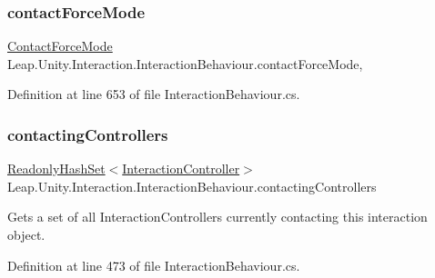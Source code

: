 \subsubsection{\texorpdfstring{contactForceMode}{contactForceMode}}
{\footnotesize\ttfamily \mbox{\hyperlink{namespace_leap_1_1_unity_1_1_interaction_a7a6c3499f7b7d02b0d389e8ac72a315f}{Contact\+Force\+Mode}} Leap.\+Unity.\+Interaction.\+Interaction\+Behaviour.\+contact\+Force\+Mode\hspace{0.3cm}{\ttfamily [get]}, {\ttfamily [set]}}



Definition at line 653 of file Interaction\+Behaviour.\+cs.

\mbox{\label{class_leap_1_1_unity_1_1_interaction_1_1_interaction_behaviour_a5bf2a4d57f21997852f8cf431e517f3f}} 
\subsubsection{\texorpdfstring{contactingControllers}{contactingControllers}}
{\footnotesize\ttfamily \mbox{\hyperlink{struct_leap_1_1_unity_1_1_readonly_hash_set}{Readonly\+Hash\+Set}}$<$\mbox{\hyperlink{class_leap_1_1_unity_1_1_interaction_1_1_interaction_controller}{Interaction\+Controller}}$>$ Leap.\+Unity.\+Interaction.\+Interaction\+Behaviour.\+contacting\+Controllers\hspace{0.3cm}{\ttfamily [get]}}



Gets a set of all Interaction\+Controllers currently contacting this interaction object. 



Definition at line 473 of file Interaction\+Behaviour.\+cs.

\mbox{\label{class_leap_1_1_unity_1_1_interaction_1_1_interaction_behaviour_a151860870ac9b7aaf9b81d1a11e9c3cf}} 
